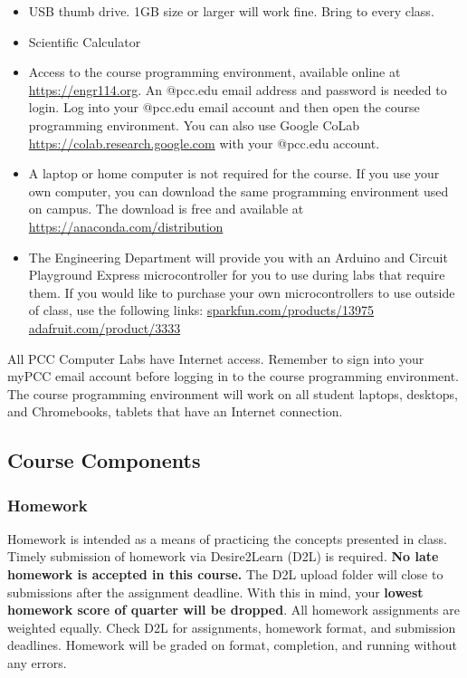 \documentclass[11pt]{article}
\providecommand{\tightlist}{%
      \setlength{\itemsep}{0pt}\setlength{\parskip}{0pt}}
\begin{document}
\begin{itemize}
\tightlist
\item
  USB thumb drive. 1GB size or larger will work fine. Bring to every
  class.
\item
  Scientific Calculator
\item
  Access to the course programming environment, available online at
  \url{https://engr114.org}. An @pcc.edu email address and password is
  needed to login. Log into your @pcc.edu email account and then open
  the course programming environment. You can also use Google CoLab
  \url{https://colab.research.google.com} with your @pcc.edu account.
\item
  A laptop or home computer is not required for the course. If you use
  your own computer, you can download the same programming environment
  used on campus. The download is free and available at
  \href{https://www.anaconda.com/distribution/}{https://anaconda.com/distribution}
\item
  The Engineering Department will provide you with an Arduino and
  Circuit Playground Express microcontroller for you to use during labs
  that require them. If you would like to purchase your own
  microcontrollers to use outside of class, use the following links:
  \href{https://www.sparkfun.com/products/13975}{sparkfun.com/products/13975}
  \href{https://www.adafruit.com/product/3333}{adafruit.com/product/3333}
\end{itemize}

All PCC Computer Labs have Internet access. Remember to sign into your
myPCC email account before logging in to the course programming
environment. The course programming environment will work on all student
laptops, desktops, and Chromebooks, tablets that have an Internet
connection.

    \hypertarget{course-components}{%
\subsection{Course Components}\label{course-components}}

    \hypertarget{homework}{%
\subsubsection{Homework}\label{homework}}

Homework is intended as a means of practicing the concepts presented in
class. Timely submission of homework via Desire2Learn (D2L) is required.
\textbf{No late homework is accepted in this course.} The D2L upload
folder will close to submissions after the assignment deadline. With
this in mind, your \textbf{lowest homework score of quarter will be
dropped}. All homework assignments are weighted equally. Check D2L for
assignments, homework format, and submission deadlines. Homework will be
graded on format, completion, and running without any errors.
\end{document}
